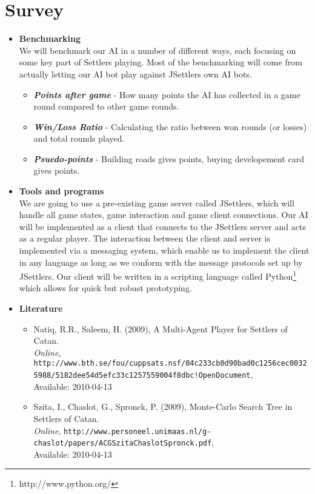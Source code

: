 \documentclass[]{article}
\begin{document}
\section{Survey}
  \begin{itemize}
    \item{\textbf{Benchmarking}\\
      We will benchmark our AI in a number of different ways, each focusing on some key part of Settlers playing. Most of the benchmarking will come from actually letting our AI bot play against JSettlers own AI bots.
      \begin{itemize}
        \item \textbf{\emph{Points after game}} - How many points the AI has collected in a game round compared to other game rounds.
        \item \textbf{\emph{Win/Loss Ratio}} - Calculating the ratio between won rounds (or losses) and total rounds played.
        \item \textbf{\emph{Psuedo-points}} - Building roads gives points, buying developement card gives points.
      \end{itemize}
    }
    \item{\textbf{Tools and programs}\\
    We are going to use a pre-existing game server called JSettlers, which will handle all game states, game interaction and game client connections. Our AI will be implemented as a client that connects to the JSettlers server and acts as a regular player. The interaction between the client and server is implemented via a messaging system, which enable us to implement the client in any language as long as we conform with the message protocols set up by JSettlers. Our client will be written in a scripting language called Python\footnote{http://www.python.org/} which allows for quick but robust prototyping.
    }
    
    \item{\textbf{Literature}
      \begin{itemize}
        \item{Natiq, R.R., Saleem, H. (2009), A Multi-Agent Player for Settlers of Catan.\\
        \emph{Online}, \texttt{http://www.bth.se/fou/cuppsats.nsf/04c233cb0d90bad0c1256cec00325988/5182dee54d5efc33c1257559004f8dbc!OpenDocument},\\
        Available: 2010-04-13}
        \item{Szita, I., Chaslot, G., Spronck, P. (2009), Monte-Carlo Search Tree in Settlers of Catan.\\
        \emph{Online}, \texttt{http://www.personeel.unimaas.nl/g-chaslot/papers/ACGSzitaChaslotSpronck.pdf},\\
        Available: 2010-04-13}


\end{itemize}}
\end{itemize}
\end{document}
